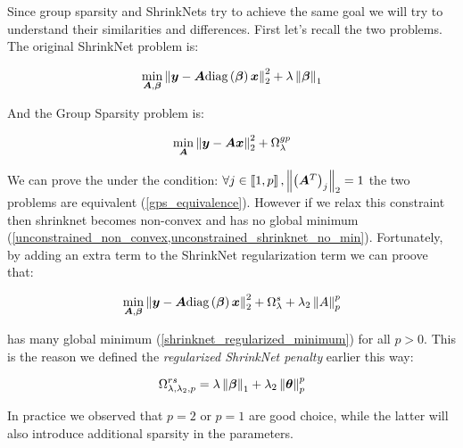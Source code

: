 Since group sparsity and ShrinkNets try to achieve the same goal we will try to understand their similarities and differences. First let's recall the two problems. The original ShrinkNet problem is:

\begin{equation}
  \min_{\bm{A}, \bm{\beta}} \left\lVert\bm{y} - \bm{A}\text{diag}\left(\bm{\beta}\right)\bm{x}\right\rVert_2^2 + \lambda \left\lVert\bm{\beta}\right\rVert_1
\end{equation}

And the Group Sparsity problem is:

\begin{equation}
  \min_{\bm{A}} \left\lVert\bm{y} - \bm{A}\bm{x}\right\rVert_2^2 + \Omega_\lambda^{gp}
\end{equation}

We can prove the under the condition: $\forall j\in \left\llbracket1, p\right\rrbracket, \left\lVert\left(\bm{A}^T\right)_j\right\rVert_2 = 1$ the two problems are equivalent (\cref{gps_equivalence}). However if we relax this constraint then shrinknet becomes non-convex and has no global minimum (\cref{unconstrained_non_convex,unconstrained_shrinknet_no_min}). Fortunately, by adding an extra term to the ShrinkNet regularization term we can proove that:

\begin{equation}
  \min_{\bm{A}, \bm{\beta}} \left\lVert\bm{y} - \bm{A}\text{diag}\left(\bm{\beta}\right)\bm{x}\right\rVert_2^2 + \Omega_\lambda^s + \lambda_2\left\lVert A\right\rVert_p^p
\end{equation}

has many global minimum (\cref{shrinknet_regularized_minimum}) for all $p>0$. This is the reason we defined the \textit{regularized ShrinkNet penalty} earlier this way:

\begin{equation}
  \Omega_{\lambda, \lambda_2, p}^{rs} = \lambda\left\lVert\bm{\beta}\right\rVert_1 + \lambda_2\left\lVert\bm\theta\right\rVert_p^p
\end{equation}

In practice we observed that $p=2$ or $p=1$ are good choice, while the latter will also introduce additional sparsity in the parameters.
